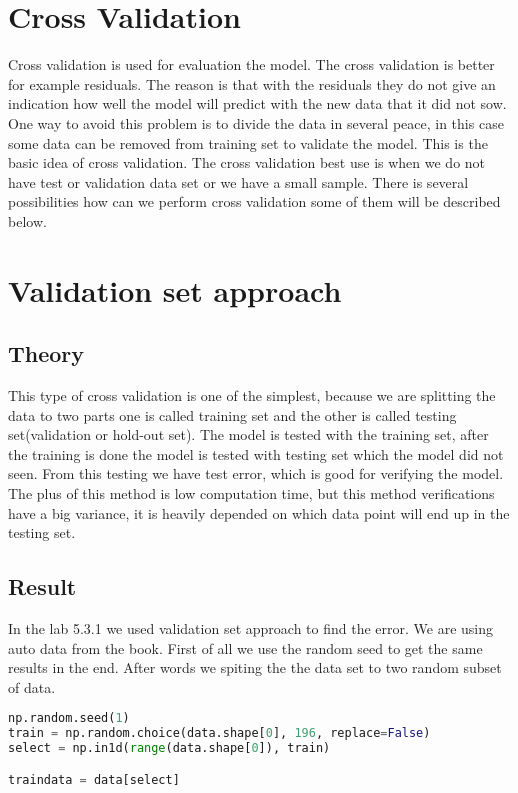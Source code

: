 \section{Cross Validation} \label{ch:crossValidation}
Cross validation is used for evaluation the model. The cross validation is better for example residuals. The reason is that with the residuals they do not give an indication how well the model will predict with the new data that it did not sow. One way to avoid this problem is to divide the data in several peace, in this case some data can be removed from training set to validate the model. This is the basic idea of cross validation. The cross validation best use is when we do not have test or validation data set or we have a small sample. There is several possibilities how can we perform cross validation some of them will be described below.


\section{Validation set approach}
\subsection{Theory}

This type of cross validation is one of the simplest, because we are splitting the data to two parts one is called training set and the other is called testing set(validation or hold-out set). The model is tested with the training set, after the training is done the model is tested with testing set which the model did not seen. From this testing we have test error, which is good for verifying the model. The plus of this method is low computation time, but this method verifications have a big variance, it is heavily depended on which data point will end up in the testing set.

\subsection{Result}

In the lab 5.3.1 we used validation set approach to find the error. We are using auto data from the book. First of all we use the random seed to get the same results in the end. After words we spiting the the data set to two random subset of data.

\begin{lstlisting}[language=Python]
np.random.seed(1)
train = np.random.choice(data.shape[0], 196, replace=False)
select = np.in1d(range(data.shape[0]), train)

traindata = data[select]
\end{lstlisting}

